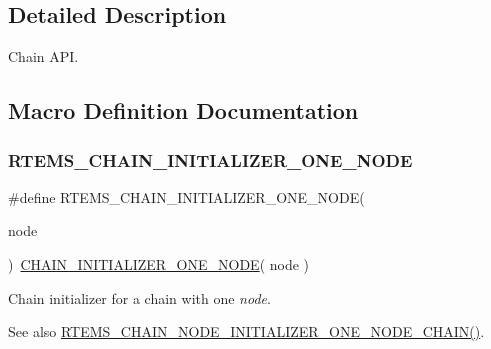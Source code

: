 \subsection{Detailed Description}
Chain A\+PI. 



\subsection{Macro Definition Documentation}
\mbox{\label{group__ClassicChains_gaa05397b51bc03203b87a1946ba1e704a}} 
\subsubsection{\texorpdfstring{RTEMS\_CHAIN\_INITIALIZER\_ONE\_NODE}{RTEMS\_CHAIN\_INITIALIZER\_ONE\_NODE}}
{\footnotesize\ttfamily \#define R\+T\+E\+M\+S\+\_\+\+C\+H\+A\+I\+N\+\_\+\+I\+N\+I\+T\+I\+A\+L\+I\+Z\+E\+R\+\_\+\+O\+N\+E\+\_\+\+N\+O\+DE(\begin{DoxyParamCaption}\item[{}]{node }\end{DoxyParamCaption})~\mbox{\hyperlink{group__RTEMSScoreChain_ga7a5473b2ce45742e83c906284e21bd90}{C\+H\+A\+I\+N\+\_\+\+I\+N\+I\+T\+I\+A\+L\+I\+Z\+E\+R\+\_\+\+O\+N\+E\+\_\+\+N\+O\+DE}}( node )}



Chain initializer for a chain with one {\itshape node}. 

\begin{DoxySeeAlso}{See also}
\mbox{\hyperlink{group__ClassicChains_gae867af63c6f18251ec2c566c0bc7ed71}{R\+T\+E\+M\+S\+\_\+\+C\+H\+A\+I\+N\+\_\+\+N\+O\+D\+E\+\_\+\+I\+N\+I\+T\+I\+A\+L\+I\+Z\+E\+R\+\_\+\+O\+N\+E\+\_\+\+N\+O\+D\+E\+\_\+\+C\+H\+A\+I\+N()}}. 
\end{DoxySeeAlso}
\mbox{\label{group__ClassicChains_gae867af63c6f18251ec2c566c0bc7ed71}} 
